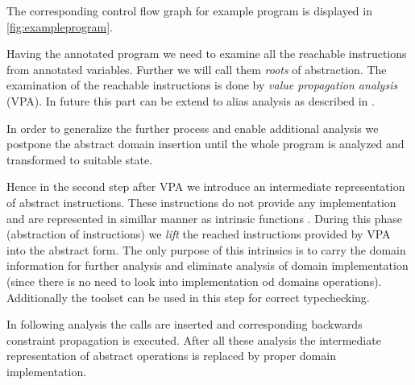 
The corresponding control flow graph for example program is displayed in
\autoref{fig:exampleprogram}.

Having the annotated program we need to examine all the reachable instructions
from annotated variables. Further we will call them \emph{roots} of abstraction.
The examination of the reachable instructions is done by \emph{value propagation
analysis} (VPA).
In future this part can be extend to alias analysis as described in
\cite{Rockai15}.

In order to generalize the further process and enable additional analysis we
postpone the abstract domain insertion until the whole program is analyzed and
transformed to suitable state.

Hence in the second step after VPA we introduce an intermediate representation of
abstract instructions. These instructions do not provide any implementation and
are represented in simillar manner as \LLVM intrinsic functions
\cite{LLVM:langref}. During this phase (abstraction of instructions) we
\emph{lift} the reached instructions provided by VPA into the abstract form. The
only purpose of this intrinsics is to carry the domain information for further
analysis and eliminate analysis of domain implementation (since there is no need
to look into implementation od domains operations). Additionally the \LLVM
toolset can be used in this step for correct typechecking.

In following analysis the  calls are inserted and corresponding
backwards constraint propagation is executed. After all these analysis the
intermediate representation of abstract operations is replaced by proper domain
implementation.

